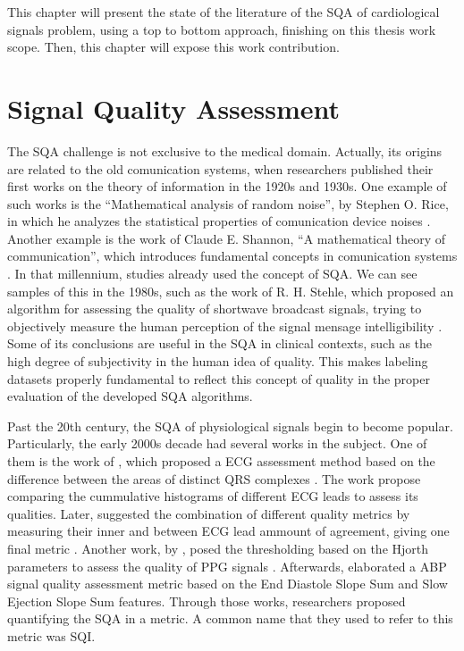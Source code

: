

This chapter will present the state of the literature of the \gls{SQA} of cardiological signals problem, using a top to bottom approach, finishing on this thesis work scope. Then, this chapter will expose this work contribution.

\section{Signal Quality Assessment}

The \gls{SQA} challenge is not exclusive to the medical domain. Actually, its origins are related to the old comunication systems, when researchers published their first works on the theory of information in the 1920s and 1930s. One example of such works is the ``Mathematical analysis of random noise'', by Stephen O. Rice, in which he analyzes the statistical properties of comunication device noises \cite{origins-1}. Another example is the work of Claude E. Shannon, ``A mathematical theory of communication'', which introduces fundamental concepts in comunication systems \cite{origins-2}. In that millennium, studies already used the concept of \gls{SQA}. We can see samples of this in the 1980s, such as the work of R. H. Stehle, which proposed an algorithm for assessing the quality of shortwave broadcast signals, trying to objectively measure the human perception of the signal mensage intelligibility \cite{origins-3}. Some of its conclusions are useful in the \gls{SQA} in clinical contexts, such as the high degree of subjectivity in the human idea of quality. This makes labeling datasets properly fundamental to reflect this concept of quality in the proper evaluation of the developed \gls{SQA} algorithms.
	
Past the 20th century, the \gls{SQA} of physiological signals begin to become popular. Particularly, the early 2000s decade had several works in the subject. One of them is the work of \citeauthor{2000s-1}, which proposed a \gls{ECG} assessment method based on the difference between the areas of distinct QRS complexes \cite{2000s-1}. The work propose comparing the cummulative histograms of different \gls{ECG} leads to assess its qualities. Later, \citeauthor{2000s-2} suggested the combination of different quality metrics by measuring their inner and between \gls{ECG} lead ammount of agreement, giving one final metric \cite{2000s-2}. Another work, by \citeauthor{2000s-3}, posed the thresholding based on the Hjorth parameters to assess the quality of \gls{PPG} signals \cite{2000s-3}. Afterwards, \citeauthor{2000s-4} elaborated a \gls{ABP} signal quality assessment metric based on the End Diastole Slope Sum and Slow Ejection Slope Sum features. Through those works, researchers proposed quantifying the \gls{SQA} in a metric. A common name that they used to refer to this metric was \gls{SQI}. 


